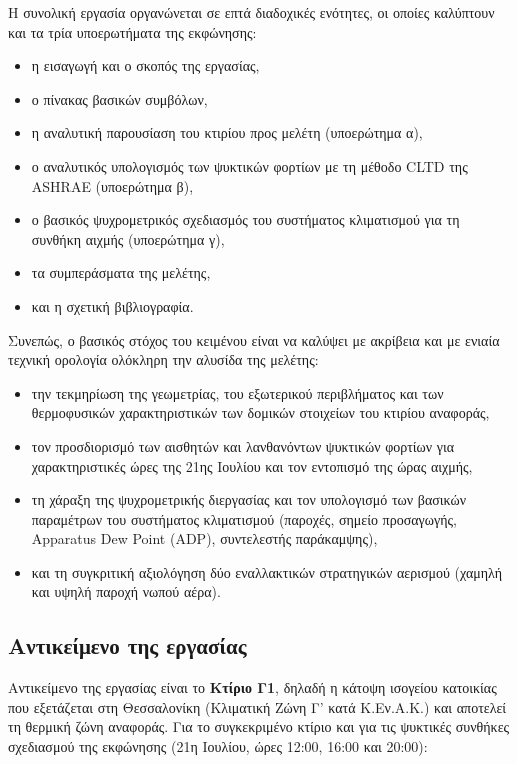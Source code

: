 \documentclass[12pt,a4paper]{article}
\begin{document}
Η συνολική εργασία οργανώνεται σε επτά διαδοχικές ενότητες, οι οποίες καλύπτουν
και τα τρία υποερωτήματα της εκφώνησης:

\begin{itemize}
\item η εισαγωγή και ο σκοπός της εργασίας,
\item ο πίνακας βασικών συμβόλων,
\item η αναλυτική παρουσίαση του κτιρίου προς μελέτη (υποερώτημα α),
\item ο αναλυτικός υπολογισμός των ψυκτικών φορτίων με τη μέθοδο \textenglish{CLTD} της \textenglish{ASHRAE} (υποερώτημα β),
\item ο βασικός ψυχρομετρικός σχεδιασμός του συστήματος κλιματισμού για τη συνθήκη αιχμής (υποερώτημα γ),
\item τα συμπεράσματα της μελέτης,
\item και η σχετική βιβλιογραφία.
\end{itemize}

Συνεπώς, ο βασικός στόχος του κειμένου είναι να καλύψει με ακρίβεια και με ενιαία
τεχνική ορολογία ολόκληρη την αλυσίδα της μελέτης:

\begin{itemize}
\item την τεκμηρίωση της γεωμετρίας, του εξωτερικού περιβλήματος και των θερμοφυσικών
χαρακτηριστικών των δομικών στοιχείων του κτιρίου αναφοράς,
\item τον προσδιορισμό των αισθητών και λανθανόντων ψυκτικών φορτίων για χαρακτηριστικές
ώρες της 21ης Ιουλίου και τον εντοπισμό της ώρας αιχμής,
\item τη χάραξη της ψυχρομετρικής διεργασίας και τον υπολογισμό των βασικών παραμέτρων
του συστήματος κλιματισμού (παροχές, σημείο προσαγωγής, \textenglish{Apparatus Dew Point (ADP)}, συντελεστής παράκαμψης),
\item και τη συγκριτική αξιολόγηση δύο εναλλακτικών στρατηγικών αερισμού (χαμηλή και υψηλή παροχή νωπού αέρα).
\end{itemize}

\subsection{Αντικείμενο της εργασίας}

Αντικείμενο της εργασίας είναι το \textbf{Κτίριο Γ1}, δηλαδή η κάτοψη ισογείου
κατοικίας που εξετάζεται στη Θεσσαλονίκη (Κλιματική Ζώνη Γ' κατά Κ.Εν.Α.Κ.) και
αποτελεί τη θερμική ζώνη αναφοράς. Για το συγκεκριμένο κτίριο και για τις
ψυκτικές συνθήκες σχεδιασμού της εκφώνησης (21η Ιουλίου, ώρες 12:00, 16:00 και
20:00):
\end{document}
